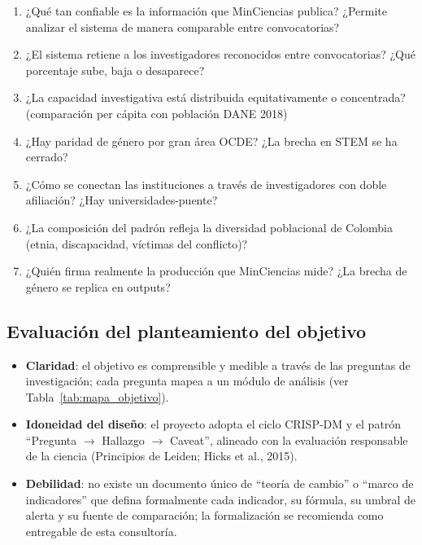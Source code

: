 \begin{enumerate}
  \item ¿Qué tan confiable es la información que MinCiencias publica? ¿Permite
        analizar el sistema de manera comparable entre convocatorias?
  \item ¿El sistema retiene a los investigadores reconocidos entre convocatorias?
        ¿Qué porcentaje sube, baja o desaparece?
  \item ¿La capacidad investigativa está distribuida equitativamente o concentrada?
        (comparación per cápita con población DANE 2018)
  \item ¿Hay paridad de género por gran área OCDE? ¿La brecha en STEM se ha cerrado?
  \item ¿Cómo se conectan las instituciones a través de investigadores con doble
        afiliación? ¿Hay universidades-puente?
  \item ¿La composición del padrón refleja la diversidad poblacional de Colombia
        (etnia, discapacidad, víctimas del conflicto)?
  \item ¿Quién firma realmente la producción que MinCiencias mide? ¿La brecha de
        género se replica en outputs?
\end{enumerate}

\subsection{Evaluación del planteamiento del objetivo}

\begin{itemize}
  \item \textbf{Claridad}: el objetivo es comprensible y medible a través de las
        preguntas de investigación; cada pregunta mapea a un módulo de análisis
        (ver Tabla~\ref{tab:mapa_objetivo}).
  \item \textbf{Idoneidad del diseño}: el proyecto adopta el ciclo CRISP-DM y el
        patrón ``Pregunta $\rightarrow$ Hallazgo $\rightarrow$ Caveat'', alineado con
        la evaluación responsable de la ciencia (Principios de Leiden; Hicks et
        al., 2015).
  \item \textbf{Debilidad}: no existe un documento único de ``teoría de cambio'' o
        ``marco de indicadores'' que defina formalmente cada indicador, su fórmula,
        su umbral de alerta y su fuente de comparación; la formalización se
        recomienda como entregable de esta consultoría.
\end{itemize}


